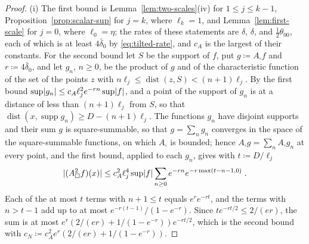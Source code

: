 \documentclass[11pt]{preprint}
\newcommand{\dist}{\operatorname{dist}}
\DeclarePairedDelimiter{\abs}{\lvert}{\rvert}
\numberwithin{equation}{section}
\theoremstyle{definition}
\theoremstyle{remark}
\theoremstyle{plain}
\begin{document}
\begin{proof}
(i) The first bound is Lemma~\ref{lem:two-scales}(iv) for $1 \leq j \leq k - 1$, Proposition~\ref{prop:scalar-sup} for $j = k$, where $\ell_k = 1$, and Lemma~\ref{lem:first-scale} for $j = 0$, where $\ell_0 = \eta$; the rates of these statements are $\delta$, $\delta$, and $\frac12\theta_{00}$, each of which is at least $4\bar\delta_0$ by \eqref{eq:tilted-rate}, and $c_A$ is the largest of their constants. For the second bound let $S$ be the support of $f$, put $g \coloneqq A_\square f$ and $r \coloneqq 4\bar\delta_0$, and let $g_n$, $n \geq 0$, be the product of $g$ and of the characteristic function of the set of the points $z$ with $n\ell_j \leq \dist(z, S) < (n + 1)\ell_j$. By the first bound $\sup\abs{g_n} \leq c_A\ell_j^2e^{-rn}\sup\abs f$, and a point of the support of $g_n$ is at a distance of less than $(n + 1)\ell_j$ from $S$, so that $\dist(x, \operatorname{supp}g_n) \geq D - (n + 1)\ell_j$. The functions $g_n$ have disjoint supports and their sum $g$ is square-summable, so that $g = \sum_ng_n$ converges in the space of the square-summable functions, on which $A_\square$ is bounded; hence $A_\square g = \sum_nA_\square g_n$ at every point, and the first bound, applied to each $g_n$, gives with $t \coloneqq D/\ell_j$
\begin{equation}\label{eq:local-square-sum}
    \abs{(A_\square^2f)(x)} \leq c_A^2\ell_j^4\sup\abs f\sum_{n \geq 0}e^{-rn}e^{-r\max(t - n - 1, 0)}\;.
\end{equation}
Each of the at most $t$ terms with $n + 1 \leq t$ equals $e^re^{-rt}$, and the terms with $n > t - 1$ add up to at most $e^{-r(t - 1)}/(1 - e^{-r})$. Since $te^{-rt/2} \leq 2/(er)$, the sum is at most $e^r(2/(er) + 1/(1 - e^{-r}))e^{-rt/2}$, which is the second bound with $c_N \coloneqq c_A^2e^r(2/(er) + 1/(1 - e^{-r}))$.


\end{proof}
\end{document}
